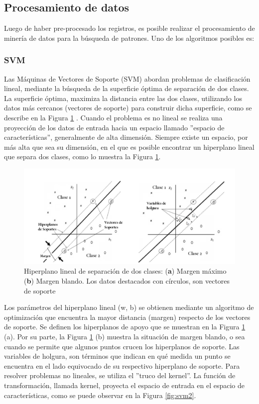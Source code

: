 \subsection{Procesamiento de datos}
Luego de haber pre-procesado los registros, es posible realizar el procesamiento de minería de datos para la búsqueda de patrones. Uno de los algoritmos posibles es:
\subsubsection{SVM}
Las Máquinas de Vectores de Soporte (SVM) abordan problemas de clasificación lineal, mediante la búsqueda de la superficie óptima de separación de dos clases. La superficie óptima, maximiza la distancia entre las dos clases, utilizando los datos más cercanos (vectores de soporte) para construir dicha superficie, como se describe en la Figura \ref{fig:svm} \cite{Cortes1995}. Cuando el problema es no lineal se realiza una proyección de los datos de entrada hacia un espacio llamado ''espacio de características'', generalmente de alta dimensión. Siempre existe un espacio, por más alta que sea su dimensión, en el que es posible encontrar un hiperplano lineal que separa dos clases, como lo muestra la Figura \ref{fig:svm}.

\begin{figure}[H]
\centering
\includegraphics[scale=0.9]{img/svm}
\caption{Hiperplano lineal de separación de dos clases: (\textbf{a}) Margen máximo (\textbf{b}) Margen blando. Los datos destacados con círculos, son vectores de soporte}
\label{fig:svm}
\end{figure}
\newpage
Los parámetros del hiperplano lineal (w, b) se obtienen mediante un algoritmo de optimización que encuentra la mayor distancia (margen) respecto de los vectores de soporte\cite{Scholkopf2001}. Se definen los hiperplanos de apoyo que se muestran en la Figura \ref{fig:svm} (a). Por su parte, la Figura \ref{fig:svm} (b) muestra la situación de margen blando, o sea cuando se permite que algunos puntos crucen los hiperplanos de soporte. Las variables de holgura, son términos que indican en qué medida un punto se encuentra en el lado equivocado de su respectivo hiperplano de soporte. Para resolver problemas no lineales, se utiliza el ''truco del kernel''\cite{Scholkopf2001}. La función de transformación, llamada kernel, proyecta el espacio de entrada en el espacio de características, como se puede observar en la Figura \ref{fig:svm2}.


